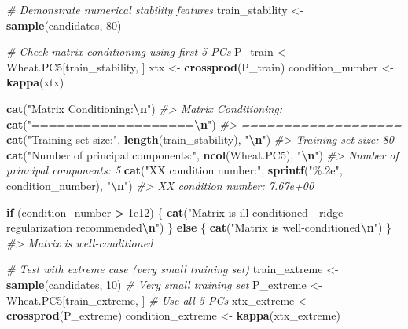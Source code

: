 \documentclass[
]{article}
\newenvironment{Shaded}{\begin{snugshade}}{\end{snugshade}}
\newcommand{\CommentTok}[1]{\textcolor[rgb]{0.56,0.35,0.01}{\textit{#1}}}
\newcommand{\ControlFlowTok}[1]{\textcolor[rgb]{0.13,0.29,0.53}{\textbf{#1}}}
\newcommand{\DecValTok}[1]{\textcolor[rgb]{0.00,0.00,0.81}{#1}}
\newcommand{\FloatTok}[1]{\textcolor[rgb]{0.00,0.00,0.81}{#1}}
\newcommand{\FunctionTok}[1]{\textcolor[rgb]{0.13,0.29,0.53}{\textbf{#1}}}
\newcommand{\NormalTok}[1]{#1}
\newcommand{\OtherTok}[1]{\textcolor[rgb]{0.56,0.35,0.01}{#1}}
\newcommand{\SpecialCharTok}[1]{\textcolor[rgb]{0.81,0.36,0.00}{\textbf{#1}}}
\newcommand{\StringTok}[1]{\textcolor[rgb]{0.31,0.60,0.02}{#1}}
\begin{document}
\begin{Shaded}
\begin{Highlighting}[]
\CommentTok{\# Demonstrate numerical stability features}
\NormalTok{train\_stability }\OtherTok{\textless{}{-}} \FunctionTok{sample}\NormalTok{(candidates, }\DecValTok{80}\NormalTok{)}

\CommentTok{\# Check matrix conditioning using first 5 PCs}
\NormalTok{P\_train }\OtherTok{\textless{}{-}}\NormalTok{ Wheat.PC5[train\_stability, ]}
\NormalTok{xtx }\OtherTok{\textless{}{-}} \FunctionTok{crossprod}\NormalTok{(P\_train)}
\NormalTok{condition\_number }\OtherTok{\textless{}{-}} \FunctionTok{kappa}\NormalTok{(xtx)}

\FunctionTok{cat}\NormalTok{(}\StringTok{"Matrix Conditioning:}\SpecialCharTok{\textbackslash{}n}\StringTok{"}\NormalTok{)}
\CommentTok{\#\textgreater{} Matrix Conditioning:}
\FunctionTok{cat}\NormalTok{(}\StringTok{"===================}\SpecialCharTok{\textbackslash{}n}\StringTok{"}\NormalTok{)}
\CommentTok{\#\textgreater{} ===================}
\FunctionTok{cat}\NormalTok{(}\StringTok{"Training set size:"}\NormalTok{, }\FunctionTok{length}\NormalTok{(train\_stability), }\StringTok{"}\SpecialCharTok{\textbackslash{}n}\StringTok{"}\NormalTok{)}
\CommentTok{\#\textgreater{} Training set size: 80}
\FunctionTok{cat}\NormalTok{(}\StringTok{"Number of principal components:"}\NormalTok{, }\FunctionTok{ncol}\NormalTok{(Wheat.PC5), }\StringTok{"}\SpecialCharTok{\textbackslash{}n}\StringTok{"}\NormalTok{)}
\CommentTok{\#\textgreater{} Number of principal components: 5}
\FunctionTok{cat}\NormalTok{(}\StringTok{"X\textquotesingle{}X condition number:"}\NormalTok{, }\FunctionTok{sprintf}\NormalTok{(}\StringTok{"\%.2e"}\NormalTok{, condition\_number), }\StringTok{"}\SpecialCharTok{\textbackslash{}n}\StringTok{"}\NormalTok{)}
\CommentTok{\#\textgreater{} X\textquotesingle{}X condition number: 7.67e+00}

\ControlFlowTok{if}\NormalTok{ (condition\_number }\SpecialCharTok{\textgreater{}} \FloatTok{1e12}\NormalTok{) \{}
  \FunctionTok{cat}\NormalTok{(}\StringTok{"Matrix is ill{-}conditioned {-} ridge regularization recommended}\SpecialCharTok{\textbackslash{}n}\StringTok{"}\NormalTok{)}
\NormalTok{\} }\ControlFlowTok{else}\NormalTok{ \{}
  \FunctionTok{cat}\NormalTok{(}\StringTok{"Matrix is well{-}conditioned}\SpecialCharTok{\textbackslash{}n}\StringTok{"}\NormalTok{)}
\NormalTok{\}}
\CommentTok{\#\textgreater{} Matrix is well{-}conditioned}

\CommentTok{\# Test with extreme case (very small training set)}
\NormalTok{train\_extreme }\OtherTok{\textless{}{-}} \FunctionTok{sample}\NormalTok{(candidates, }\DecValTok{10}\NormalTok{)  }\CommentTok{\# Very small training set}
\NormalTok{P\_extreme }\OtherTok{\textless{}{-}}\NormalTok{ Wheat.PC5[train\_extreme, ]  }\CommentTok{\# Use all 5 PCs}
\NormalTok{xtx\_extreme }\OtherTok{\textless{}{-}} \FunctionTok{crossprod}\NormalTok{(P\_extreme)}
\NormalTok{condition\_extreme }\OtherTok{\textless{}{-}} \FunctionTok{kappa}\NormalTok{(xtx\_extreme)}


\end{Highlighting}
\end{Shaded}
\end{document}
